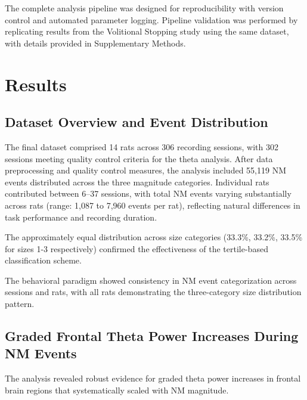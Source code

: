\documentclass[11pt]{article}
\begin{document}
The complete analysis pipeline was designed for reproducibility with version control and automated parameter logging. Pipeline validation was performed by replicating results from the Volitional Stopping study using the same dataset, with details provided in Supplementary Methods.

\section{Results}

\subsection{Dataset Overview and Event Distribution}

The final dataset comprised 14 rats across 306 recording sessions, with 302 sessions meeting quality control criteria for the theta analysis. After data preprocessing and quality control measures, the analysis included 55,119 NM events distributed across the three magnitude categories. Individual rats contributed between 6--37 sessions, with total NM events varying substantially across rats (range: 1,087 to 7,960 events per rat), reflecting natural differences in task performance and recording duration.

The approximately equal distribution across size categories (33.3\%, 33.2\%, 33.5\% for sizes 1-3 respectively) confirmed the effectiveness of the tertile-based classification scheme.

The behavioral paradigm showed consistency in NM event categorization across sessions and rats, with all rats demonstrating the three-category size distribution pattern.

\subsection{Graded Frontal Theta Power Increases During NM Events}

The analysis revealed robust evidence for graded theta power increases in frontal brain regions that systematically scaled with NM magnitude.
\end{document}
